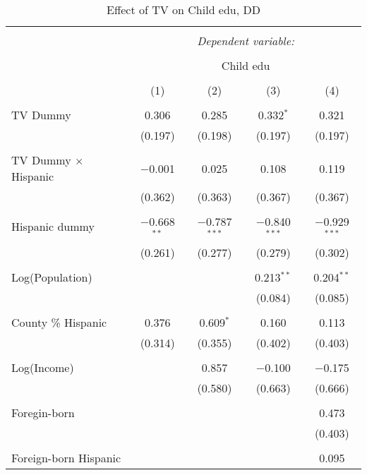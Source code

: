 
\begin{table}[!htbp] \centering 
  \caption{Effect of TV on Child edu, DD} 
  \label{} 
\begin{tabular}{@{\extracolsep{-5pt}}lcccc} 
\\[-1.8ex]\hline 
\hline \\[-1.8ex] 
 & \multicolumn{4}{c}{\textit{Dependent variable:}} \\ 
\cline{2-5} 
\\[-1.8ex] & \multicolumn{4}{c}{Child edu} \\ 
\\[-1.8ex] & (1) & (2) & (3) & (4)\\ 
\hline \\[-1.8ex] 
 TV Dummy & 0.306 & 0.285 & 0.332$^{*}$ & 0.321 \\ 
  & (0.197) & (0.198) & (0.197) & (0.197) \\ 
  & & & & \\ 
 TV Dummy $\times$ Hispanic  & $-$0.001 & 0.025 & 0.108 & 0.119 \\ 
  & (0.362) & (0.363) & (0.367) & (0.367) \\ 
  & & & & \\ 
 Hispanic dummy & $-$0.668$^{**}$ & $-$0.787$^{***}$ & $-$0.840$^{***}$ & $-$0.929$^{***}$ \\ 
  & (0.261) & (0.277) & (0.279) & (0.302) \\ 
  & & & & \\ 
 Log(Population) &  &  & 0.213$^{**}$ & 0.204$^{**}$ \\ 
  &  &  & (0.084) & (0.085) \\ 
  & & & & \\ 
 County \% Hispanic & 0.376 & 0.609$^{*}$ & 0.160 & 0.113 \\ 
  & (0.314) & (0.355) & (0.402) & (0.403) \\ 
  & & & & \\ 
 Log(Income) &  & 0.857 & $-$0.100 & $-$0.175 \\ 
  &  & (0.580) & (0.663) & (0.666) \\ 
  & & & & \\ 
 Foregin-born &  &  &  & 0.473 \\ 
  &  &  &  & (0.403) \\ 
  & & & & \\ 
 Foreign-born Hispanic &  &  &  & 0.095 \\ 

\end{tabular}
\end{table}
